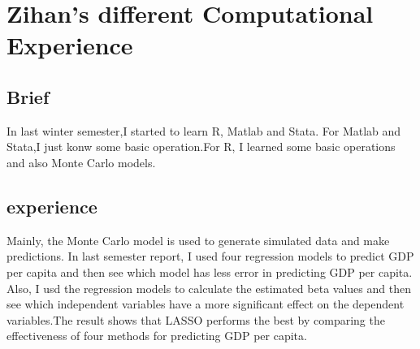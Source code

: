 \section{Zihan's different Computational Experience}
\subsection{Brief}
In last winter semester,I started to learn R, Matlab and Stata. For Matlab and
Stata,I just konw some basic operation.For R, I learned some basic operations and also Monte Carlo models.
\subsection{experience}
 Mainly, the Monte Carlo model is used to generate simulated data and make predictions. In last
semester report, I used four regression models to predict GDP per capita and
then see which model has less error in predicting GDP per capita. Also, I
usd the regression models to calculate the estimated beta values and then see
which independent variables have a more significant effect on the dependent
variables.The result shows that LASSO performs the best by comparing the
effectiveness of four methods for predicting GDP per capita. 
